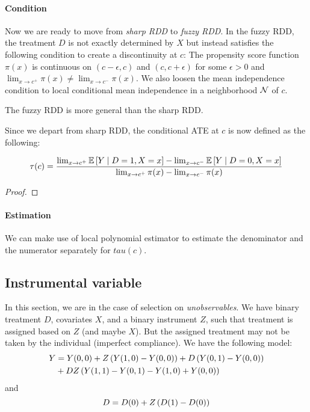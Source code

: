 \paragraph{Condition}
Now we are ready to move from \emph{sharp RDD} to \emph{fuzzy RDD}. In the
fuzzy RDD, the treatment $D$ is not exactly determined by $X$ but instead
satisfies the following condition to create a discontinuity at $c$: The
propensity score function $\pi(x)$ is continuous on $(c-\epsilon,c)$ and
$(c,c+\epsilon)$ for some $\epsilon>0$ and $\lim_{x\to c^+}\pi(x)\neq
    \lim_{x\to c^-}\pi(x)$. We also loosen the mean independence condition to local
conditional mean independence in a neighborhood $\mathcal{N}$ of $c$.
\begin{remark}
    The fuzzy RDD is more general than the sharp RDD.
\end{remark}
Since we depart from sharp RDD, the conditional ATE at $c$ is now defined as the following:
\begin{proposition}\begin{equation*}
        \tau(c) = \frac{\lim_{x\to c^+}\mathbb{E}\left[Y\mid D=1,X=x\right]-\lim_{x\to c^-}\mathbb{E}\left[Y\mid D=0,X=x\right]}{\lim_{x\to c^+}\pi(x)-\lim_{x\to c^-}\pi(x)}
    \end{equation*}
\end{proposition}
\begin{proof}

\end{proof}
\paragraph{Estimation}
We can make use of local polynomial estimator to estimate the denominator and
the numerator separately for $tau(c)$.

\subsection{Instrumental variable}

In this section, we are in the case of selection on \emph{unobservables}. We
have binary treatment $D$, covariates $X$, and a binary instrument $Z$, such
that treatment is assigned based on $Z$ (and maybe $X$). But the assigned
treatment may not be taken by the individual (imperfect compliance). We have
the following model:
\begin{equation}
    \begin{split}
        Y & = Y(0,0)+Z\left(Y(1,0)-Y(0,0)\right)+D\left(Y(0,1)-Y(0,0)\right) \\
          & + DZ\left(Y(1,1)-Y(0,1)-Y(1,0)+Y(0,0)\right)
    \end{split}
\end{equation}
and \begin{equation}
    D=D(0)+Z\left(D(1)-D(0)\right)
\end{equation}
